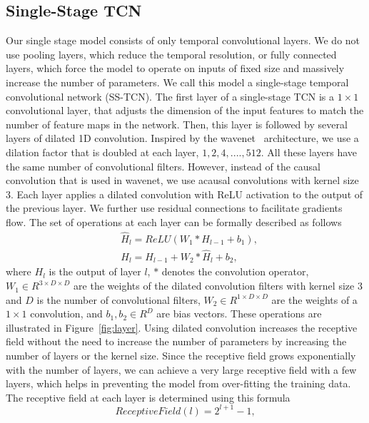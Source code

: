 \documentclass[10pt,twocolumn,letterpaper]{article}
\begin{document}
\subsection{Single-Stage TCN}
\label{sec:single_stage_model}
Our single stage model consists of only temporal convolutional layers. 
We do not use pooling layers, which reduce the temporal resolution, or 
fully connected layers, which force the model to operate on inputs of 
fixed size and massively increase the number of parameters. We call this 
model a single-stage temporal convolutional network (SS-TCN).
The first layer of a single-stage TCN is a $1 \times 1$ convolutional layer, 
that adjusts the dimension of the input features to match the number 
of feature maps in the network. Then, this layer is followed by several 
layers of dilated 1D convolution. Inspired by the wavenet~\cite{van2016wavenet} 
architecture, we use a dilation factor that is doubled at each layer, 
\ie $1, 2, 4, ...., 512$. All these layers have the same number of 
convolutional filters. However, instead of the causal convolution that 
is used in wavenet, we use acausal convolutions with kernel size 3. 
Each layer applies a dilated convolution with ReLU activation to the output 
of the previous layer. We further use residual connections to facilitate 
gradients flow. The set of operations at each layer can be formally 
described as follows
 \begin{align}
& \hat{H}_l = ReLU(W_1 * H_{l-1} + b_1), \\
& H_l = H_{l-1} + W_2 * \hat{H}_l + b_2, 
\end{align}
where $H_l$ is the output of layer $l$, $*$ denotes the convolution operator, 
$W_1 \in R^{3 \times D \times D}$ are the weights of the dilated convolution 
filters with kernel size 3 and $D$ is the number of convolutional filters, 
$W_2 \in R^{1 \times D \times D}$ are the weights of a $1 \times 1$ convolution, 
and $b_1, b_2 \in R^{D}$ are bias vectors. These operations are illustrated in 
Figure~\ref{fig:layer}. Using dilated convolution increases the receptive field 
without the need to increase the number of parameters by increasing the number 
of layers or the kernel size. Since the receptive field grows exponentially with 
the number of layers, we can achieve a very large receptive field with a few layers, 
which helps in preventing the model from over-fitting the training data. The receptive 
field at each layer is determined using this formula 
\begin{equation}
ReceptiveField(l) = 2^{l+1} - 1, 
\end{equation}
\end{document}
